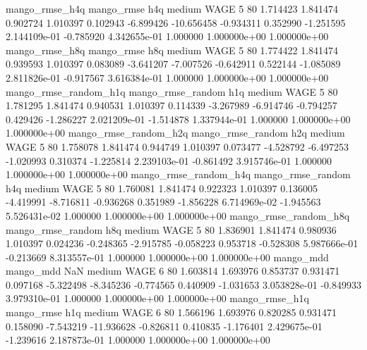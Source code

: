        mango_rmse_h4q        mango_rmse                  h4q     medium     WAGE                 5 80  1.714423       1.841474 0.902724       1.010397    0.102943     -6.899426    -10.656458    -0.934311       0.352990 -1.251595 2.144109e-01    -0.785920   4.342655e-01            1.000000    1.000000e+00        1.000000e+00
       mango_rmse_h8q        mango_rmse                  h8q     medium     WAGE                 5 80  1.774422       1.841474 0.939593       1.010397    0.083089     -3.641207     -7.007526    -0.642911       0.522144 -1.085089 2.811826e-01    -0.917567   3.616384e-01            1.000000    1.000000e+00        1.000000e+00
mango_rmse_random_h1q mango_rmse_random                  h1q     medium     WAGE                 5 80  1.781295       1.841474 0.940531       1.010397    0.114339     -3.267989     -6.914746    -0.794257       0.429426 -1.286227 2.021209e-01    -1.514878   1.337944e-01            1.000000    1.000000e+00        1.000000e+00
mango_rmse_random_h2q mango_rmse_random                  h2q     medium     WAGE                 5 80  1.758078       1.841474 0.944749       1.010397    0.073477     -4.528792     -6.497253    -1.020993       0.310374 -1.225814 2.239103e-01    -0.861492   3.915746e-01            1.000000    1.000000e+00        1.000000e+00
mango_rmse_random_h4q mango_rmse_random                  h4q     medium     WAGE                 5 80  1.760081       1.841474 0.922323       1.010397    0.136005     -4.419991     -8.716811    -0.936268       0.351989 -1.856228 6.714969e-02    -1.945563   5.526431e-02            1.000000    1.000000e+00        1.000000e+00
mango_rmse_random_h8q mango_rmse_random                  h8q     medium     WAGE                 5 80  1.836901       1.841474 0.980936       1.010397    0.024236     -0.248365     -2.915785    -0.058223       0.953718 -0.528308 5.987666e-01    -0.213669   8.313557e-01            1.000000    1.000000e+00        1.000000e+00
            mango_mdd         mango_mdd                  NaN     medium     WAGE                 6 80  1.603814       1.693976 0.853737       0.931471    0.097168     -5.322498     -8.345236    -0.774565       0.440909 -1.031653 3.053828e-01    -0.849933   3.979310e-01            1.000000    1.000000e+00        1.000000e+00
       mango_rmse_h1q        mango_rmse                  h1q     medium     WAGE                 6 80  1.566196       1.693976 0.820285       0.931471    0.158090     -7.543219    -11.936628    -0.826811       0.410835 -1.176401 2.429675e-01    -1.239616   2.187873e-01            1.000000    1.000000e+00        1.000000e+00
